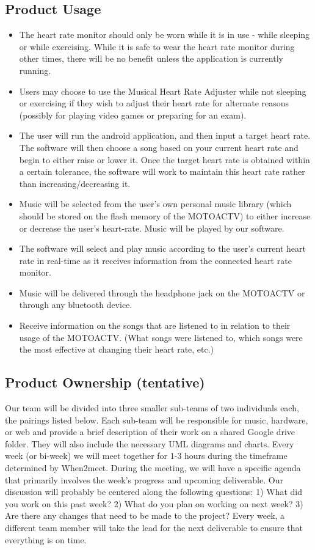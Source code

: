 \documentclass[letterpaper,english, 12pt]{scrreprt}
\begin{document}
\subsection{Product Usage}
\begin{itemize}
	\item The heart rate monitor should only be worn while it is in use - while sleeping or while exercising. While it is safe to wear the heart rate monitor during other times, there will be no benefit unless the application is currently running. 
	\item Users may choose to use the Musical Heart Rate Adjuster while not sleeping or exercising if they wish to adjust their heart rate for alternate reasons (possibly for playing video games or preparing for an exam). 
	\item The user will run the android application, and then input a target heart rate. The software will then choose a song based on your current heart rate and begin to either raise or lower it. Once the target heart rate is obtained within a certain tolerance, the software will work to maintain this heart rate rather than increasing/decreasing it.
	\item Music will be selected from the user's own personal music library (which should be stored on the flash memory of the MOTOACTV) to either increase or decrease the user's heart-rate. Music will be played by our software.
	\item The software will select and play music according to the user's current heart rate in real-time as it receives information from the connected heart rate monitor.
	\item Music will be delivered through the headphone jack on the MOTOACTV or through any bluetooth device.
	\item Receive information on the songs that are listened to in relation to their usage of the MOTOACTV. (What songs were listened to, which songs were the most effective at changing their heart rate, etc.)
\end{itemize}

\subsection{Product Ownership (tentative)}
Our team will be divided into three smaller sub-teams of two individuals each, the pairings listed below. Each sub-team will be responsible for music, hardware, or web and provide a brief description of their work on a shared Google drive folder. They will also include the necessary UML diagrams and charts. Every week (or bi-week) we will meet together for 1-3 hours during the timeframe determined by When2meet. During the meeting, we will have a specific agenda that primarily involves the week's progress and upcoming deliverable. Our discussion will probably be centered along the following questions: 1) What did you work on this past week? 2) What do you plan on working on next week? 3) Are there any changes that need to be made to the project? Every week, a different team member will take the lead for the next deliverable to ensure that everything is on time.          	
\end{document}
